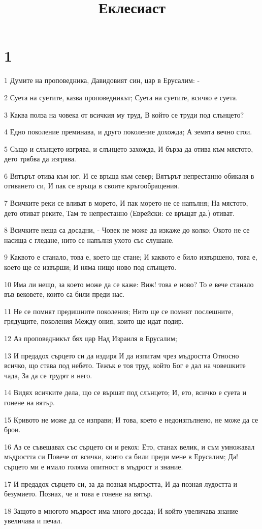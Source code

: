 

\title{Еклесиаст}


\chapter{1}

\par 1 Думите на проповедника, Давидовият син, цар в Ерусалим: -
\par 2 Суета на суетите, казва проповедникът; Суета на суетите, всичко е суета.
\par 3 Каква полза на човека от всичкия му труд, В който се труди под слънцето?
\par 4 Едно поколение преминава, и друго поколение дохожда; А земята вечно стои.
\par 5 Също и слънцето изгрява, и слънцето захожда, И бърза да отива към мястото, дето трябва да изгрява.
\par 6 Вятърът отива към юг, И се връща към север; Вятърът непрестанно обикаля в отиването си, И пак се връща в своите кръгообращения.
\par 7 Всичките реки се вливат в морето, И пак морето не се напълня; На мястото, дето отиват реките, Там те непрестанно (Еврейски: се връщат да.) отиват.
\par 8 Всичките неща са досадни, - Човек не може да изкаже до колко; Окото не се насища с гледане, нито се напълня ухото със слушане.
\par 9 Каквото е станало, това е, което ще стане; И каквото е било извършено, това е, което ще се извърши; И няма нищо ново под слънцето.
\par 10 Има ли нещо, за което може да се каже: Виж! това е ново? То е вече станало във вековете, които са били преди нас.
\par 11 Не се помнят предишните поколения; Нито ще се помнят послешните, грядущите, поколения Между ония, които ще идат подир.
\par 12 Аз проповедникът бях цар Над Израиля в Ерусалим;
\par 13 И предадох сърцето си да издиря И да изпитам чрез мъдростта Относно всичко, що става под небето. Тежък е тоя труд, който Бог е дал на човешките чада, За да се трудят в него.
\par 14 Видях всичките дела, що се вършат под слънцето; И, ето, всичко е суета и гонене на вятър.
\par 15 Кривото не може да се изправи; И това, което е недоизпълнено, не може да се брои.
\par 16 Аз се съвещавах със сърцето си и рекох: Ето, станах велик, и съм умножавал мъдростта си Повече от всички, които са били преди мене в Ерусалим; Да! сърцето ми е имало голяма опитност в мъдрост и знание.
\par 17 И предадох сърцето си, за да позная мъдростта, И да позная лудостта и безумието. Познах, че и това е гонене на вятър.
\par 18 Защото в многото мъдрост има много досада; И който увеличава знание увеличава и печал.

